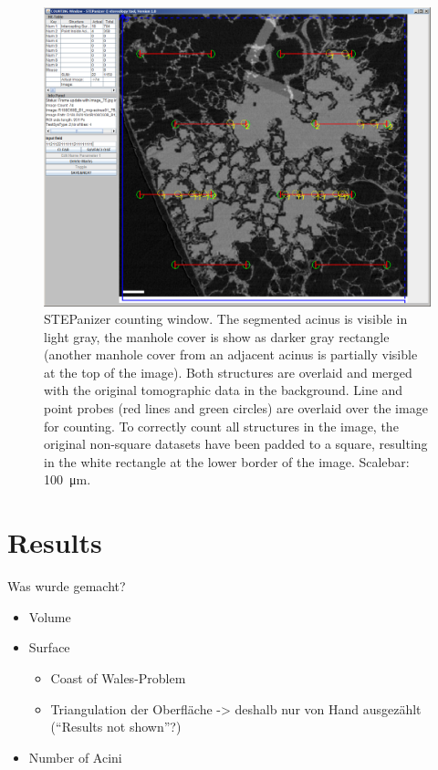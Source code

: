 \documentclass[%
	draft,
	paper=a4,%
	abstract=true,%
	]{scrartcl}
\newcommand{\imsize}{\linewidth}
\begin{document}
\renewcommand{\imsize}{\linewidth}%
\begin{figure}
	\centering
	\includegraphics[width=\imsize]{img/STEPanizer_2010_R108C60B_acinus01_Slice75}
	\caption{STEPanizer counting window. The segmented acinus is visible in light gray, the manhole cover is show as darker gray rectangle (another manhole cover from an adjacent acinus is partially visible at the top of the image). Both structures are overlaid and merged with the original tomographic data in the background. Line and point probes (red lines and green circles) are overlaid over the image for counting. To correctly count all structures in the image, the original non-square datasets have been padded to a square, resulting in the white rectangle at the lower border of the image. Scalebar: \SI{100}{\micro\meter}.}
	\label{fig:STEPanizer}
\end{figure}

\section{Results}
Was wurde gemacht?
\begin{itemize}
	\item Volume
	\item Surface
	\begin{itemize}
		\item Coast of Wales-Problem
		\item Triangulation der Oberfläche -> deshalb nur von Hand ausgezählt (“Results not shown”?)
	\end{itemize}
	\item Number of Acini
\end{itemize}
\end{document}
